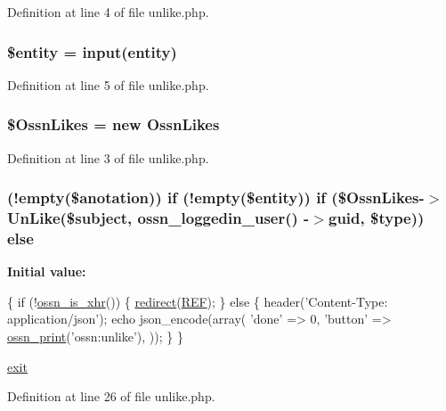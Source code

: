 Definition at line 4 of file unlike.\+php.

\subsubsection[{\texorpdfstring{\$entity}{$entity}}]{\setlength{\rightskip}{0pt plus 5cm}\$entity = {\bf input}(\textquotesingle{}entity\textquotesingle{})}\hypertarget{post_2unlike_8php_a74ed34e6d7bc9f3f8c4fb58a12247ee2}{}\label{post_2unlike_8php_a74ed34e6d7bc9f3f8c4fb58a12247ee2}


Definition at line 5 of file unlike.\+php.

\subsubsection[{\texorpdfstring{\$\+Ossn\+Likes}{$OssnLikes}}]{\setlength{\rightskip}{0pt plus 5cm}\${\bf Ossn\+Likes} = new {\bf Ossn\+Likes}}\hypertarget{post_2unlike_8php_a227f36ff099a95468945a2fabc5c0782}{}\label{post_2unlike_8php_a227f36ff099a95468945a2fabc5c0782}


Definition at line 3 of file unlike.\+php.

\subsubsection[{\texorpdfstring{else}{else}}]{ (!empty(\$anotation)) {\bf if} (!empty(\$entity)) {\bf if} (\${\bf Ossn\+Likes}-\/$>$Un\+Like(\$subject, {\bf ossn\+\_\+loggedin\+\_\+user}() -\/$>$guid, \${\bf type})) else}\hypertarget{post_2unlike_8php_a3d440c410af257318642b9a619682a7f}{}\label{post_2unlike_8php_a3d440c410af257318642b9a619682a7f}
{\bfseries Initial value\+:}
\begin{DoxyCode}
\{
    \textcolor{keywordflow}{if} (!\hyperlink{ossn_8lib_8system_8php_ac764e738f5c840432bbe4771e4fa27a7}{ossn\_is\_xhr}()) \{
        \hyperlink{ossn_8lib_8system_8php_a33cafdb93398ec540993c12c1daa0c48}{redirect}(\hyperlink{ossn_8lib_8system_8php_a6141904c50990cdd468f07046f29bb5c}{REF});
    \} \textcolor{keywordflow}{else} \{
        header(\textcolor{stringliteral}{'Content-Type: application/json'});
        echo json\_encode(array(
                \textcolor{stringliteral}{'done'} => 0,
                \textcolor{stringliteral}{'button'} => \hyperlink{ossn_8lib_8languages_8php_a2be5d1c4b695593a9b9067b96df2150a}{ossn\_print}(\textcolor{stringliteral}{'ossn:unlike'}),
            ));
    \}
\}

\hyperlink{register_8php_a6733eb5f605d09eaede9845835d71c4e}{exit}
\end{DoxyCode}


Definition at line 26 of file unlike.\+php.

